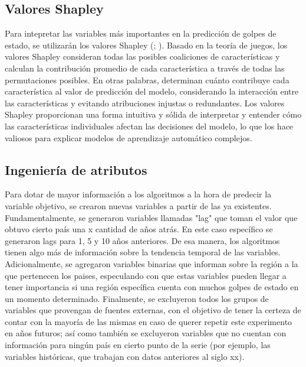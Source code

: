 \documentclass{article}
\begin{document}
\subsection{Valores Shapley}
Para intepretar las variables más importantes en la predicción de golpes de estado, se 
utilizarán los valores Shapley (\cite{Str10}; \cite{Lun17}). Basado en la teoría de 
juegos, los valores Shapley  consideran todas las posibles coaliciones de características 
y calculan la contribución promedio de cada característica a través de todas las 
permutaciones posibles. En otras palabras, determinan cuánto contribuye cada 
característica al valor de predicción del modelo, considerando la interacción entre las 
características y evitando atribuciones injustas o redundantes. Los valores Shapley
proporcionan una forma intuitiva y sólida de interpretar y entender cómo las 
características individuales afectan las decisiones del modelo, lo que los hace valiosos 
para explicar modelos de aprendizaje automático complejos.

\subsection{Ingeniería de atributos}
Para dotar de mayor información a los algoritmos a la hora de predecir la variable
objetivo, se crearon nuevas variables a partir de las ya existentes. Fundamentalmente,
se generaron variables llamadas "lag" que toman el valor que obtuvo cierto país una x
cantidad de años atrás. En este caso específico se generaron lags para 1, 5 y 10 años 
anteriores. De esa manera, los algoritmos tienen algo más de información sobre la 
tendencia temporal de las variables. Adicionalmente, se agregaron variables binarias
que informan sobre la región a la que pertenecen los paises, especulando con que estas
variables pueden llegar a tener importancia si una región específica cuenta con muchos
golpes de estado en un momento determinado. Finalmente, se excluyeron todos los grupos
de variables que provengan de fuentes externas, con el objetivo de tener la certeza de
contar con la mayoría de las mismas en caso de querer repetir este experimento en años 
futuros; así como también se excluyeron variables que no cuentan con información para 
ningún país en cierto punto de la serie (por ejemplo, las variables históricas, que 
trabajan con datos anteriores al siglo xx).
\end{document}

